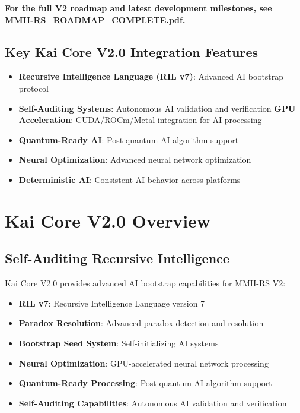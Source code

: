 \documentclass[12pt,a4paper]{article}
\begin{document}
\textbf{For the full V2 roadmap and latest development milestones, see MMH-RS\_ROADMAP\_COMPLETE.pdf.}

\subsection{Key Kai Core V2.0 Integration Features}
\begin{itemize}
    \item \textbf{Recursive Intelligence Language (RIL v7)}: Advanced AI bootstrap protocol
    \item \textbf{Self-Auditing Systems}: Autonomous AI validation and verification
    \textbf{GPU Acceleration}: CUDA/ROCm/Metal integration for AI processing
    \item \textbf{Quantum-Ready AI}: Post-quantum AI algorithm support
    \item \textbf{Neural Optimization}: Advanced neural network optimization
    \item \textbf{Deterministic AI}: Consistent AI behavior across platforms
\end{itemize}

\section{Kai Core V2.0 Overview}

\subsection{Self-Auditing Recursive Intelligence}
Kai Core V2.0 provides advanced AI bootstrap capabilities for MMH-RS V2:

\begin{itemize}
    \item \textbf{RIL v7}: Recursive Intelligence Language version 7
    \item \textbf{Paradox Resolution}: Advanced paradox detection and resolution
    \item \textbf{Bootstrap Seed System}: Self-initializing AI systems
    \item \textbf{Neural Optimization}: GPU-accelerated neural network processing
    \item \textbf{Quantum-Ready Processing}: Post-quantum AI algorithm support
    \item \textbf{Self-Auditing Capabilities}: Autonomous AI validation and verification
\end{itemize}
\end{document}
